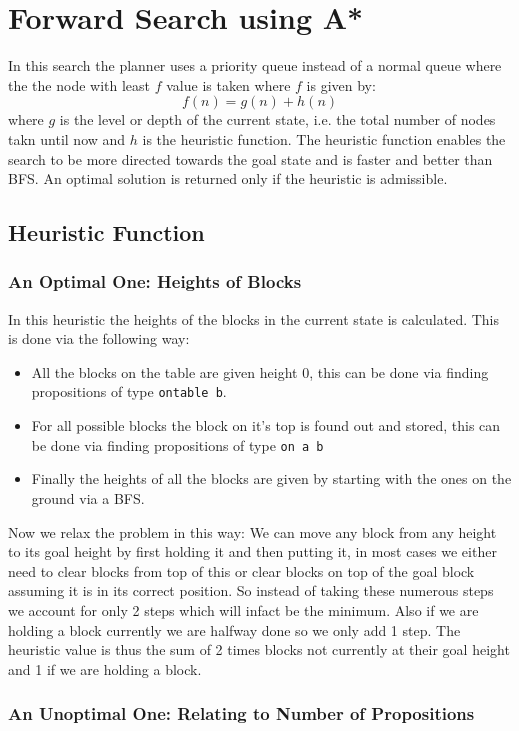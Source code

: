 \documentclass{article}
\begin{document}
\section{Forward Search using A*}
In this search the planner uses a priority queue instead of a normal queue where the the node with least $f$ value is taken where $f$ is given by:
$$f(n)=g(n)+h(n)$$
where $g$ is the level or depth of the current state, i.e. the total number of nodes takn until now and $h$ is the heuristic function. The heuristic function enables the search to be more directed towards the goal state and is faster and better than BFS. An optimal solution is returned only if the heuristic is admissible.
\subsection{Heuristic Function}
\subsubsection{An Optimal One: Heights of Blocks}
In this heuristic the heights of the blocks in the current state is calculated. This is done via the following way:
\begin{itemize}
\item All the blocks on the table are given height 0, this can be done via finding propositions of type \verb|ontable b|.
\item For all possible blocks the block on it's top is found out and stored, this can be done via finding propositions of type \verb|on a b|
\item Finally the heights of all the blocks are given by starting with the ones on the ground via a BFS.
\end{itemize}
Now we relax the problem in this way: We can move any block from any height to its goal height by first holding it and then putting it, in most cases we either need to clear blocks from top of this or clear blocks on top of the goal block assuming it is in its correct position. So instead of taking these numerous steps we account for only 2 steps which will infact be the minimum. Also if we are holding a block currently we are halfway done so we only add 1 step. The heuristic value is thus the sum of 2 times blocks not currently at their goal height and 1 if we are holding a block.
\subsubsection{An Unoptimal One: Relating to Number of Propositions}
\pagebreak
\end{document}
